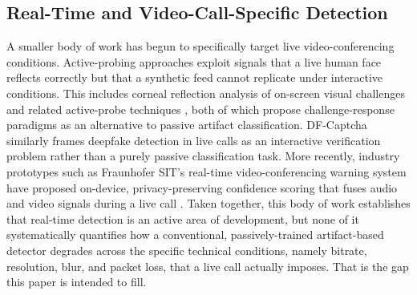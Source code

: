 \documentclass[conference]{IEEEtran}
\begin{document}
\subsection{Real-Time and Video-Call-Specific Detection}
A smaller body of work has begun to specifically target live video-conferencing conditions. Active-probing approaches exploit signals that a live human face reflects correctly but that a synthetic feed cannot replicate under interactive conditions. This includes corneal reflection analysis of on-screen visual challenges \cite{activeprobing2022} and related active-probe techniques \cite{shakingfake2024}, both of which propose challenge-response paradigms as an alternative to passive artifact classification. DF-Captcha \cite{dfcaptcha2022} similarly frames deepfake detection in live calls as an interactive verification problem rather than a purely passive classification task. More recently, industry prototypes such as Fraunhofer SIT's real-time video-conferencing warning system have proposed on-device, privacy-preserving confidence scoring that fuses audio and video signals during a live call \cite{fraunhofer2026}. Taken together, this body of work establishes that real-time detection is an active area of development, but none of it systematically quantifies how a conventional, passively-trained artifact-based detector degrades across the specific technical conditions, namely bitrate, resolution, blur, and packet loss, that a live call actually imposes. That is the gap this paper is intended to fill.
\end{document}
